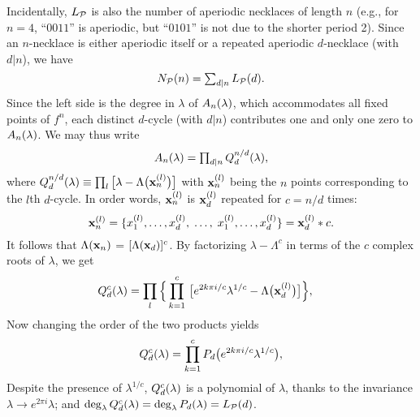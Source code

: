 \documentclass{ws-ijbc}
\begin{document}
Incidentally, $L_\mathcal P$ is also the number of aperiodic necklaces of length $n$
(e.g., for $n = 4$,
  ``$0011$'' is aperiodic, but ``$0101$'' is not due to the shorter period 2).
%
Since an $n$-necklace is either aperiodic itself or
  a repeated aperiodic $d$-necklace (with $d|n$),
  we have
\begin{equation}
  N_\mathcal P(n) = \textstyle\sum_{d|n} L_\mathcal P(d).
\label{eq:necklacelyndon}
\end{equation}
%
Since the left side is the degree in $\lambda$ of $A_n(\lambda)$,
  which accommodates all fixed points of $f^n$,
  each distinct $d$-cycle (with $d|n$)
  contributes one and only one zero to $A_n(\lambda)$.
%
%
We may thus write
  \begin{equation}
    A_n(\lambda) = \textstyle\prod_{d|n} Q_d^{n/d}(\lambda),
    \label{eq:prod}
  \end{equation}
where $Q_d^{n/d}(\lambda) \equiv \prod_l
  \big[\lambda - \Lambda\big(\mathbf{x}_{n}^{(l)}\big) \big]$
  with $\mathbf{x}_{n}^{(l)}$ being the $n$ points
  corresponding to the $l$th $d$-cycle.
%
In order words, $\mathbf{x}_{n}^{(l)}$ is $\mathbf{x}_{d}^{(l)}$
  repeated for $c = n/d$ times:
\begin{equation}
  \mathbf{x}_{n}^{(l)} =
  \{
    x_1^{(l)}, \ldots, x_d^{(l)},
    \; \ldots, \;
    x_1^{(l)}, \ldots, x_d^{(l)}
  \}
  = \mathbf{x}_{d}^{(l)} * c.
\notag
\end{equation}
%
It follows that
$\Lambda(\mathbf{x}_{n})$ = $[\Lambda(\mathbf{x}_{d})]^c$.
%
By factorizing $\lambda - \Lambda^c$
  in terms of the $c$ complex roots of $\lambda$,
  we get
%
\begin{align}
Q_d^{c}(\lambda)
  &=
    \prod_l
    \Big\{
      \prod_{k=1}^c \,
      \big[
          e^{2k\pi i/c} \lambda^{1/c}
          - \Lambda\big(\mathbf{x}_{d}^{(l)}\big)
      \big]
    \Big\},
    \notag
\end{align}
%
Now changing the order of the two products yields
\begin{equation}
Q_d^{c}(\lambda)
  =  \prod_{k=1}^c P_d\big(e^{2k\pi i/c} \lambda^{1/c}\big),
\label{eq:QP}
\end{equation}
%
%
Despite the presence of $\lambda^{1/c}$,
  $Q_d^c(\lambda)$ is a polynomial of $\lambda$,
  thanks to the invariance
  $\lambda \rightarrow e^{2\pi i} \lambda$;
and
  $\deg_\lambda Q_d^c(\lambda)
    = \deg_\lambda P_d(\lambda) = L_\mathcal P(d)$.
\end{document}
